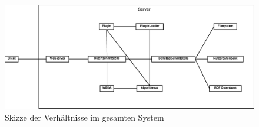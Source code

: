 \begin{figure}[h]
\hspace{-0.15\linewidth}\includegraphics[width=1.5\linewidth]{Grafik/Diagramm/Gesamt}
\caption[Gesamtsystem]{Skizze der Verhältnisse im gesamten System}
\label{fig:Gesamt}
\end{figure}
